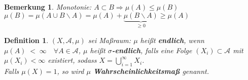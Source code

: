 \documentclass[11pt]{memoir}
\theoremstyle{changebreak}
\newtheorem{Definition}{Definition}[chapter]
\newtheorem{Bemerkung}{Bemerkung}[chapter]
\begin{document}
\begin{Bemerkung}
Monotonie: $A \subset B \Rightarrow \mu(A) \leq \mu(B)$\\
$\mu(B) = \mu(A \cup B\backslash A) = \mu(A) + \underbrace{\mu(B\backslash A)}_{\geq 0}\geq \mu(A)$
\end{Bemerkung}

\begin{Definition}
$(X, \mathscr{A}, \mu)$ sei Maßraum: $\mu$ heißt \textbf{endlich}, wenn $\mu(A)\; <\; \infty \quad \forall A \in \mathscr{A}$, $\mu$ heißt \textbf{$\sigma$-endlich}, falls eine Folge $(X_i) \subset \mathscr{A}$ mit $\mu(X_i) < \infty $ existiert, sodass $X = \bigcup\limits_{i=1}^{\infty} X_i$. \\
Falls $\mu(X) = 1$, so wird $\mu$ \textbf{Wahrscheinlichkeitsmaß} genannt.
\end{Definition}
\end{document}
